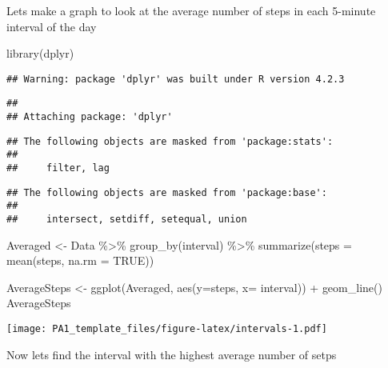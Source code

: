 \documentclass[
]{article}
\newenvironment{Shaded}{\begin{snugshade}}{\end{snugshade}}
\newcommand{\AttributeTok}[1]{\textcolor[rgb]{0.77,0.63,0.00}{#1}}
\newcommand{\ConstantTok}[1]{\textcolor[rgb]{0.00,0.00,0.00}{#1}}
\newcommand{\FunctionTok}[1]{\textcolor[rgb]{0.00,0.00,0.00}{#1}}
\newcommand{\NormalTok}[1]{#1}
\newcommand{\OtherTok}[1]{\textcolor[rgb]{0.56,0.35,0.01}{#1}}
\newcommand{\SpecialCharTok}[1]{\textcolor[rgb]{0.00,0.00,0.00}{#1}}
\begin{document}
Lets make a graph to look at the average number of steps in each
5-minute interval of the day

\begin{Shaded}
\begin{Highlighting}[]
\FunctionTok{library}\NormalTok{(dplyr)}
\end{Highlighting}
\end{Shaded}

\begin{verbatim}
## Warning: package 'dplyr' was built under R version 4.2.3
\end{verbatim}

\begin{verbatim}
## 
## Attaching package: 'dplyr'
\end{verbatim}

\begin{verbatim}
## The following objects are masked from 'package:stats':
## 
##     filter, lag
\end{verbatim}

\begin{verbatim}
## The following objects are masked from 'package:base':
## 
##     intersect, setdiff, setequal, union
\end{verbatim}

\begin{Shaded}
\begin{Highlighting}[]
\NormalTok{Averaged }\OtherTok{\textless{}{-}}\NormalTok{ Data }\SpecialCharTok{\%\textgreater{}\%}
  \FunctionTok{group\_by}\NormalTok{(interval) }\SpecialCharTok{\%\textgreater{}\%}
  \FunctionTok{summarize}\NormalTok{(}\AttributeTok{steps =} \FunctionTok{mean}\NormalTok{(steps, }\AttributeTok{na.rm =} \ConstantTok{TRUE}\NormalTok{))}


\NormalTok{AverageSteps }\OtherTok{\textless{}{-}} \FunctionTok{ggplot}\NormalTok{(Averaged, }\FunctionTok{aes}\NormalTok{(}\AttributeTok{y=}\NormalTok{steps, }\AttributeTok{x=}\NormalTok{ interval)) }\SpecialCharTok{+}
  \FunctionTok{geom\_line}\NormalTok{()}
\NormalTok{AverageSteps}
\end{Highlighting}
\end{Shaded}

\texttt{[image: PA1\_template\_files/figure-latex/intervals-1.pdf]}

Now lets find the interval with the highest average number of setps

\begin{Shaded}
\end{Shaded}
\end{document}
